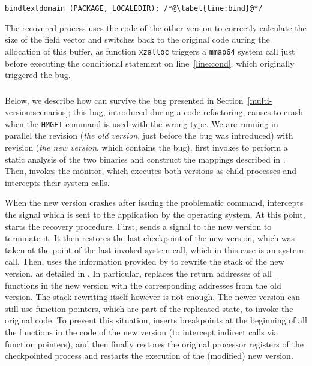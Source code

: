 \begin{lstlisting}[firstnumber=767]
bindtextdomain (PACKAGE, LOCALEDIR); /*@\label{line:bind}@*/
\end{lstlisting}

The recovered process uses the code of the other version to correctly
calculate the size of the field vector and switches back to the original
code during the allocation of this buffer, as
function \lstinline`xzalloc` triggers a \lstinline`mmap64` system call just
before executing the conditional statement on line~\ref{line:cond},
which originally triggered the bug.

\subsubsection{\redis}
\label{sec:redis}

Below, we describe how \mx can survive the \redis bug presented in
Section~\ref{multi-version:scenarios}; this bug, introduced during a code
refactoring, causes \redis to crash when the \lstinline`HMGET` command is used
with the wrong type. We are running in parallel the revision 
(\textit{the old version}, just before the bug was introduced) with revision
 (\textit{the new version}, which contains the bug).  \mx
first invokes \sea to perform a static analysis of the two binaries and
construct the mappings described in .  Then, \mx invokes the \mxm
monitor, which executes both versions as child processes and intercepts their
system calls.

When the new version crashes after issuing the problematic
 command, \mxm intercepts the  signal
which is sent to the application by the operating system.  At
this point, \rem starts the recovery procedure.  First, \rem sends a
 signal to the new version to terminate it.  It then
restores the last checkpoint of the new version, which was taken at the
point of the last invoked system call, which in this case is an
 system call.  Then, \rem uses the information
provided by \sea to rewrite the stack of the new version, as detailed
in .  In particular, \rem replaces the return
addresses of all functions in the new version with the corresponding
addresses from the old version. The stack rewriting itself however is not
enough. The newer version can still use function pointers, which are
part of the replicated state, to invoke the original code. To prevent
this situation, \rem inserts breakpoints at the beginning of all the
functions in the code of the new version (to intercept indirect calls
via function pointers), and then finally restores the original processor
registers of the checkpointed process and restarts the execution of the
(modified) new version.

